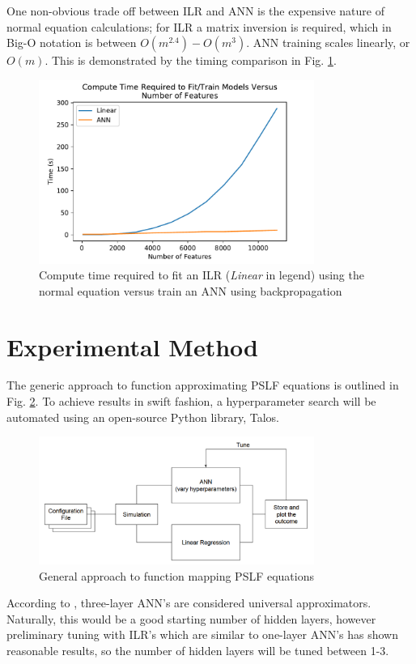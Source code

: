 \documentclass[conference]{IEEEtran}
\begin{document}
One non-obvious trade off between ILR and ANN is the expensive nature of normal equation calculations; for ILR a matrix inversion is required, which in Big-O notation is between $O(m^{2.4})-O(m^{3})$. ANN training scales linearly, or $O(m)$. This is demonstrated by the timing comparison in Fig. \ref{fig:featvstime}.

\begin{figure}[H]
	\centering
	\includegraphics[width=9cm]{featuresversustime.pdf}
	\caption{Compute time required to fit an ILR (\textit{Linear} in legend) using the normal equation versus train an ANN using backpropagation}
	\label{fig:featvstime}
\end{figure}

\section{Experimental Method}
\label{sec:model}
The generic approach to function approximating PSLF equations is outlined in Fig. \ref{fig:expapproach}. To achieve results in swift fashion, a hyperparameter search will be automated using an open-source Python library, Talos.

\begin{figure}[H]
	\centering
	\includegraphics[width=9cm]{experimentalprocedure.pdf}
	\caption{General approach to function mapping PSLF equations}
	\label{fig:expapproach}
\end{figure}

According to \cite{chen1994}\cite{du2014}, three-layer ANN's are considered universal approximators. Naturally, this would be a good starting number of hidden layers, however preliminary tuning with ILR's which are similar to one-layer ANN's has shown reasonable results, so the number of hidden layers will be tuned between 1-3. 
\end{document}
